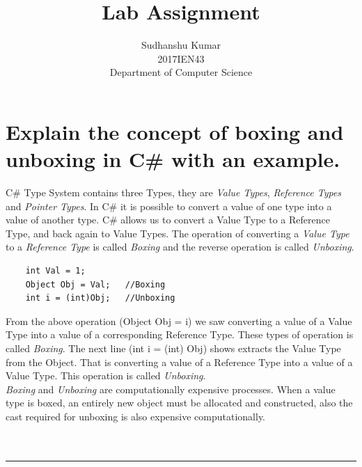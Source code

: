 \documentclass[11pt,dvipsnames,cmyk]{article}
\title{Lab Assignment}
\author{Sudhanshu Kumar\\
2017IEN43\\
Department of Computer Science}
\begin{document}
	\maketitle
	\break
	\section*{Explain the concept of boxing and unboxing in C\# with an example.}
	C\# Type System contains three Types, they are \emph{Value Types}, \emph{Reference Types} and \emph{Pointer Types}. In C\# it is possible to convert a value of one type into a value of another type. C\# allows us to convert a Value Type to a Reference Type, and back again to Value Types. The operation of converting a \emph{Value Type} to a \emph{Reference Type} is called \emph{Boxing} and the reverse operation is called \emph{Unboxing}.
	\lstset{style=sharpc}
	\begin{lstlisting}
	int Val = 1;
	Object Obj = Val;	//Boxing
	int i = (int)Obj;	//Unboxing
	\end{lstlisting}
	From the above operation (Object Obj = i) we saw converting a value of a Value Type into a value of a corresponding Reference Type. These types of operation is called \emph{Boxing}. The next line (int i = (int) Obj) shows extracts the Value Type from the Object. That is converting a value of a Reference Type into a value of a Value Type. This operation is called \emph{Unboxing}.
	\\\emph{Boxing} and \emph{Unboxing} are computationally expensive processes. When a value type is boxed, an entirely new object must be allocated and constructed, also the cast required for unboxing is also expensive computationally.\\\\\\
	\rule{6.27in}{1.2pt}
	
\end{document}
